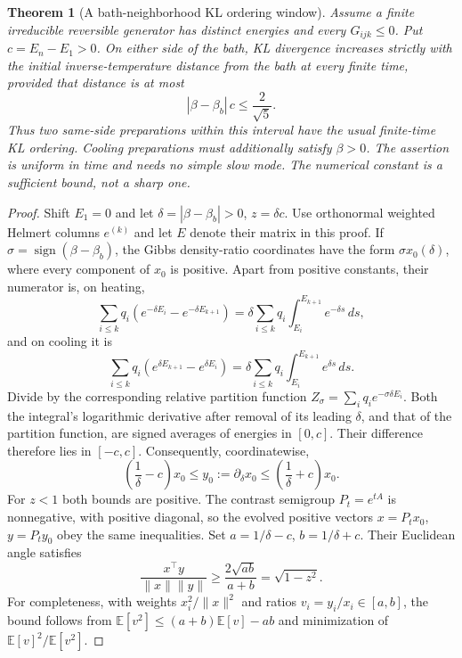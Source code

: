 \documentclass[11pt]{article}
\newtheorem{theorem}{Theorem}
\begin{document}
\begin{theorem}[A bath-neighborhood KL ordering window]
\label{thm:nearbatheentropy}
Assume a finite irreducible reversible generator has distinct energies
and every $G_{ijk}\leq0$. Put $c=E_n-E_1>0$.
On either side of the bath, KL divergence increases strictly with the
initial inverse-temperature distance from the bath at every finite time,
provided that distance is at most
\[
|\beta-\beta_b|\,c\leq\frac2{\sqrt5}.
\]
Thus two same-side preparations within this interval have the usual
finite-time KL ordering. Cooling preparations must additionally satisfy
$\beta>0$. The assertion is uniform in time and needs no simple slow
mode. The numerical constant is a sufficient bound, not a sharp one.
\end{theorem}
\begin{proof}
Shift $E_1=0$ and let $\delta=|\beta-\beta_b|>0$, $z=\delta c$.
Use orthonormal weighted Helmert columns $e^{(k)}$ and let $E$ denote
their matrix in this proof. If $\sigma=\operatorname{sign}(\beta-\beta_b)$,
the Gibbs density-ratio coordinates have the form $\sigma x_0(\delta)$,
where every component of $x_0$ is positive. Apart from positive constants,
their numerator is, on heating,
\[
\sum_{i\leq k}q_i(e^{-\delta E_i}-e^{-\delta E_{k+1}})
=\delta\sum_{i\leq k}q_i\int_{E_i}^{E_{k+1}}e^{-\delta s}\,ds,
\]
and on cooling it is
\[
\sum_{i\leq k}q_i(e^{\delta E_{k+1}}-e^{\delta E_i})
=\delta\sum_{i\leq k}q_i\int_{E_i}^{E_{k+1}}e^{\delta s}\,ds.
\]
Divide by the corresponding relative partition function
$Z_\sigma=\sum_iq_i e^{-\sigma\delta E_i}$.
Both the integral's logarithmic derivative after removal of its leading
$\delta$, and that of the partition function, are signed averages of
energies in $[0,c]$. Their difference therefore lies in $[-c,c]$.
Consequently, coordinatewise,
\[
\left(\frac1\delta-c\right)x_0
\leq y_0:=\partial_\delta x_0
\leq\left(\frac1\delta+c\right)x_0.
\]
For $z<1$ both bounds are positive. The contrast semigroup
$P_t=e^{tA}$ is nonnegative, with positive diagonal, so the evolved
positive vectors $x=P_tx_0$, $y=P_ty_0$ obey the same inequalities.
Set $a=1/\delta-c$, $b=1/\delta+c$.
Their Euclidean angle satisfies
\[
\frac{x^\top y}{\|x\|\|y\|}
\geq\frac{2\sqrt{ab}}{a+b}=\sqrt{1-z^2}.
\]
For completeness, with weights $x_i^2/\|x\|^2$ and ratios
$v_i=y_i/x_i\in[a,b]$, the bound follows from
$\mathbb E[v^2]\leq(a+b)\mathbb E[v]-ab$ and minimization of
$\mathbb E[v]^2/\mathbb E[v^2]$.


\end{proof}
\end{document}
